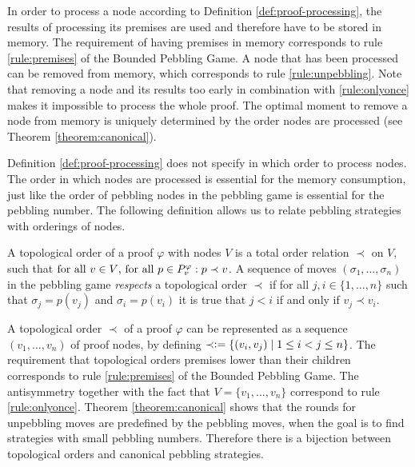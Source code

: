 In order to process a node according to Definition \ref{def:proof-processing}, the results of processing its premises are used and therefore have to be stored in memory.
The requirement of having premises in memory corresponds to rule \ref{rule:premises} of the Bounded Pebbling Game. 
A node that has been processed can be removed from memory, which corresponds to rule \ref{rule:unpebbling}.
Note that removing a node and its results too early in combination with \ref{rule:onlyonce} makes it impossible to process the whole proof.
The optimal moment to remove a node from memory is uniquely determined by the order nodes are processed (see Theorem \ref{theorem:canonical}).

Definition \ref{def:proof-processing} does not specify in which order to process nodes.
The order in which nodes are processed is essential for the memory consumption, just like the order of pebbling nodes in the pebbling game is essential for the pebbling number.
The following definition allows us to relate pebbling strategies with orderings of nodes.

\begin{definition}
\label{def:topological-order}
A topological order of a proof $\varphi$ with nodes $V$ is a total order relation $\prec$ on $V$, such that 
$\text{for all } v \in V \text{, for all } p \in P_{v}^{\varphi}:
p \prec v$.
A sequence of moves $(\sigma_1,\ldots,\sigma_n)$ in the pebbling game \emph{respects} a topological order $\prec$ if for all $j,i \in \{1,\ldots,n\}$ such that $\sigma_j = p(v_j)$ and $\sigma_i = p(v_i)$ it is true that $j < i$ if and only if $v_j \prec v_i$.
\end{definition}

A topological order $\prec$ of a proof $\varphi$ can be represented as a sequence $(v_1,\dots,v_n)$ of proof nodes, by defining $\prec \mathrel{\mathop:}= \{(v_i,v_j) \mid 1 \leq i < j \leq n\}$. 
The requirement that topological orders premises lower than their children corresponds to rule \ref{rule:premises} of the Bounded Pebbling Game.
The antisymmetry together with the fact that $V = \{v_1,\dots,v_n\}$ correspond to rule \ref{rule:onlyonce}.
Theorem \ref{theorem:canonical} shows that the rounds for unpebbling moves are predefined by the pebbling moves, when the goal is to find strategies with small pebbling numbers.
Therefore there is a bijection between topological orders and canonical pebbling strategies.


